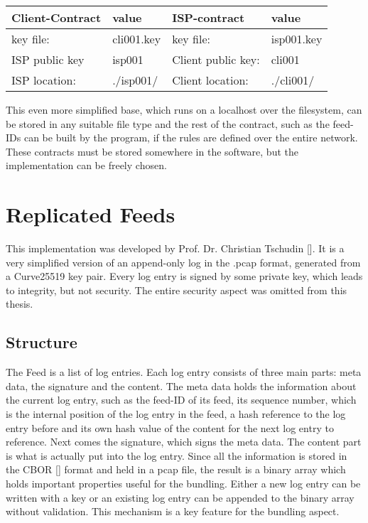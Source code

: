\begin{center}  
    \begin{tabular}{llll} \toprule
        Client-Contract&value&ISP-contract&value\\ \midrule
        key file:& cli001.key &  key file: &isp001.key  \\ 
        ISP public key&isp001&Client public key:&cli001\\
        ISP location:&.\slash isp001\slash &Client location:& .\slash cli001\slash \\\bottomrule
    \end{tabular}  
\end{center}
This even more simplified base, which runs on a localhost over the filesystem, can be stored in any suitable file type and the rest of the contract, such as the feed-IDs can be built by the program, if the rules are defined over the entire network. These contracts must be stored somewhere in the software, but the implementation can be freely chosen.

\section{Replicated Feeds}
This implementation was developed by Prof. Dr. Christian Tschudin []. It is a very simplified version of an append-only log in the .pcap format, generated from a Curve25519 key pair. Every log entry is signed by some private key, which leads to integrity, but not security. The entire security aspect was omitted from this thesis.
\subsection{Structure}
The Feed is a list of log entries. Each log entry consists of three main parts: meta data, the signature and the content. The meta data holds the information about the current log entry, such as the feed-ID of its feed, its sequence number, which is the internal position of the log entry in the feed, a hash reference to the log entry before and its own hash value of the content for the next log entry to reference. Next comes the signature, which signs the meta data. The content part is what is actually put into the log entry. Since all the information is stored in the CBOR [] format and held in a pcap file, the result is a binary array which holds important properties useful for the bundling. Either a new log entry can be written with a key or an existing log entry can be appended to the binary array without validation. This mechanism is a key feature for the bundling aspect.
